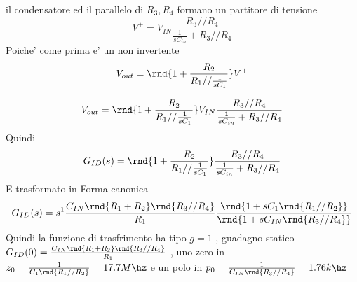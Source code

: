 \documentclass[\main/main.tex]{subfiles}
\begin{document}
il condensatore ed il parallelo di $R_3,R_4$ formano un partitore di tensione
\[V^+ = V_{IN} \frac{R_3 // R_4}{\frac{1}{sC_{in}} + R_3 // R_4}\]
Poiche' come prima e' un non invertente
\[V_{out} = \rnd{1 + \frac{R_2}{R_1 // \frac{1}{sC_1}}}V^+\]

\[V_{out} = \rnd{1 + \frac{R_2}{R_1 // \frac{1}{sC_1}}}V_{IN} \frac{R_3 // R_4}{\frac{1}{sC_{in}} + R_3 // R_4}\]
Quindi
\[G_{ID}(s) =  \rnd{1 + \frac{R_2}{R_1 // \frac{1}{sC_1}}} \frac{R_3 // R_4}{\frac{1}{sC_{in}} + R_3 // R_4}\]
E trasformato in Forma canonica
\[G_{ID}(s) = s^1 \frac{C_{IN}\rnd{R_1 + R_2}\rnd{R_3 // R_4}}{R_1} \frac{\rnd{1 + s C_1 \rnd{R_1 // R_2}}}{\rnd{1 + s C_{IN}\rnd{R_3 // R_4}}}\]
Quindi la funzione di trasfrimento ha tipo $g = 1$ , guadagno statico $G_{ID}(0) = \frac{C_{IN}\rnd{R_1 + R_2}\rnd{R_3 // R_4}}{R_1}$ , uno zero in $z_0 = \frac{1}{ C_1 \rnd{R_1 // R_2}} = 17.7M\hz$ e un polo in $p_0 = \frac{1}{ C_{IN}\rnd{R_3 // R_4}} = 1.76k\hz$

\begin{center}
\end{center}
\end{document}
